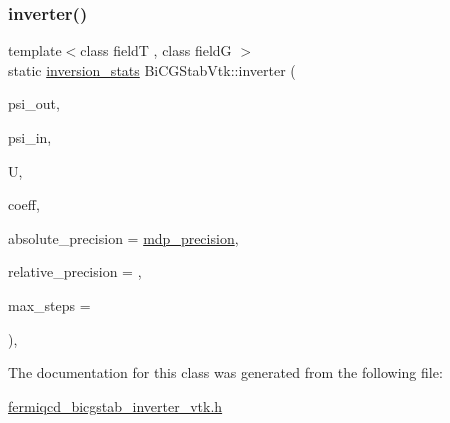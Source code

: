 \subsubsection{\texorpdfstring{inverter()}{inverter()}}
{\footnotesize\ttfamily template$<$class fieldT , class fieldG $>$ \\
static \hyperlink{classinversion__stats}{inversion\+\_\+stats} Bi\+C\+G\+Stab\+Vtk\+::inverter (\begin{DoxyParamCaption}\item[{fieldT \&}]{psi\+\_\+out,  }\item[{fieldT \&}]{psi\+\_\+in,  }\item[{fieldG \&}]{U,  }\item[{\hyperlink{classcoefficients}{coefficients} \&}]{coeff,  }\item[{\hyperlink{mdp__global__vars_8h_a69d96b74c791e0bbdb888b3913a69450}{mdp\+\_\+real}}]{absolute\+\_\+precision = {\ttfamily \hyperlink{mdp__global__vars_8h_a443a4ca745298420893e113a7ac926a9}{mdp\+\_\+precision}},  }\item[{\hyperlink{mdp__global__vars_8h_a69d96b74c791e0bbdb888b3913a69450}{mdp\+\_\+real}}]{relative\+\_\+precision = {},  }\item[{int}]{max\+\_\+steps = {} }\end{DoxyParamCaption})\hspace{0.3cm}{\ttfamily [inline]}, {\ttfamily [static]}}



The documentation for this class was generated from the following file\+:\begin{DoxyCompactItemize}
\item 
\hyperlink{fermiqcd__bicgstab__inverter__vtk_8h}{fermiqcd\+\_\+bicgstab\+\_\+inverter\+\_\+vtk.\+h}\end{DoxyCompactItemize}
